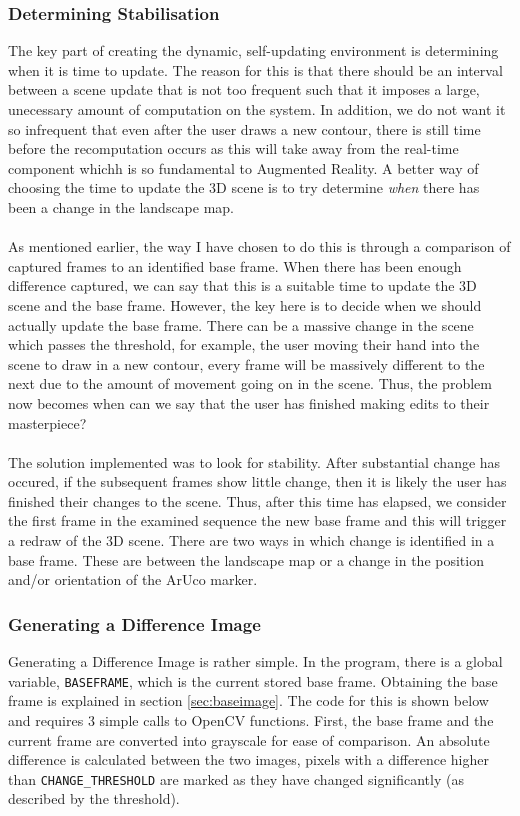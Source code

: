 \documentclass[11pt]{article}
\begin{document}
\subsubsection{Determining Stabilisation}
The key part of creating the dynamic, self-updating environment
is determining when it is time to update. The reason for this
is that there should be an interval between a scene update that is 
not too frequent such that it imposes a large, unecessary amount of
computation on the system. In addition, 
we do not want it so infrequent that even after the user draws 
a new contour, there is still time before the recomputation occurs 
as this will take away from the real-time component whichh is so 
fundamental to Augmented Reality. A better way of choosing the time 
to update the 3D scene is to try determine \textit{when}
there has been a change in the landscape map.\\
\\ 
As mentioned earlier, the way I have chosen to do this is through 
a comparison of captured frames to an identified base frame. When 
there has been enough difference captured, we can say that this is
a suitable time to update the 3D scene and the base frame. 
However, the key here is to decide when we should actually update 
the base frame. There can be a massive change in the scene which
passes the threshold, for example, the user moving their hand into the
scene to draw in a new contour, every frame will be massively different
to the next due to the amount of movement going on in the scene. Thus,
the problem now becomes when can we say that the user has finished 
making edits to their masterpiece?\\
\\
The solution implemented was to look for stability. After substantial
change has occured, if the subsequent frames show little change, then
it is likely the user has finished their changes to the scene. Thus,
after this time has elapsed, we consider the first frame in the
examined sequence the new base frame and this will trigger a redraw of
the 3D scene. There are two ways in which change is identified in a base 
frame. These are between the landscape map or a change in the position
and/or orientation of the ArUco marker. 

\subsubsection{Generating a Difference Image}
Generating a Difference Image is rather simple. In the program, there is
a global variable, \texttt{BASEFRAME}, which is the current stored base frame.
Obtaining the base frame is explained in section \ref{sec:baseimage}. The
code for this is shown below and requires 3 simple calls to OpenCV 
functions. First, the base frame and the current frame are converted
into grayscale for ease of comparison. An absolute difference is calculated
between the two images, pixels with a difference higher than
\texttt{CHANGE\_THRESHOLD} are marked as they have changed significantly 
(as described by the threshold).
\end{document}
